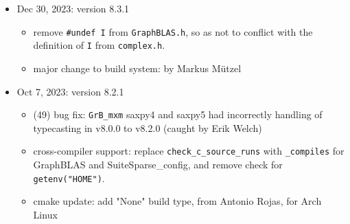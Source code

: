 \begin{itemize}
    \begin{itemize}
    \item \verb'GrB_get/GrB_set': new functions from the v2.1 C API.
    \item \verb'GrB_Type_new', \verb'GrB_UnaryOp_new',
        \verb'GrB_IndexUnaryOp_new': no longer macros, since \verb'GrB_set' can
        be used to set the names of the operators.  These methods no longer
        extract the name, so the default name is now the empty string.  This is
        because \verb'GrB_get/set' can only set these names once.  This is a
        non-compatible change of behavior for these 3 methods, so
        SuiteSparse:GraphBLAS must become v9.0.0.
    \item historical methods:  many methods are replaced by \verb'GrB_get' and
        \verb'GrB_set'.  They remain in SuiteSparse:GraphBLAS but have been
        declared historical.  Terse prototypes exist in GraphBLAS.h, and any
        discussion is removed from the User Guide:  \verb'GxB_get',
        \verb'GxB_set', and the methods they call, and many more.  Use
        \verb'GrB_get/set' in place those methods, and for:
        \verb'GxB_*type_name', \verb'GxB_*type', \verb'GxB_Monoid_operator',
        \verb'GxB_Monoid_identity', \verb'GxB_Monoid_terminal',
        \verb'GxB_Semiring_add', \verb'GxB_Semiring_multiply'.  Use \newline
        \verb'GrB_STORAGE_ORIENTATION_HINT' in place of \verb'GxB_FORMAT'.
    \item \verb'hyper_hash': constructed only if the number of non-empty
        vectors in a hypersparse matrix is large ($> 1024$, by default).
    \item minor updates to build system: \verb'*.pc' files for \verb'pkgconfig'
    \end{itemize}

\item Dec 30, 2023: version 8.3.1

    \begin{itemize}
    \item remove \verb'#undef I' from \verb'GraphBLAS.h', so as not to conflict
        with the definition of \verb'I' from \verb'complex.h'.
    \item major change to build system: by Markus M\"{u}tzel
    \end{itemize}

\item Oct 7, 2023: version 8.2.1

    \begin{itemize}
    \item (49) bug fix: \verb'GrB_mxm' saxpy4 and saxpy5 had incorrectly handling of
        typecasting in v8.0.0 to v8.2.0 (caught by Erik Welch)
    \item cross-compiler support: replace \verb'check_c_source_runs' with \verb'_compiles'
        for GraphBLAS and SuiteSparse\_config, and remove check for
        \verb'getenv("HOME")'.
    \item cmake update: add "None" build type, from Antonio Rojas, for Arch Linux
    \end{itemize}


\end{itemize}
